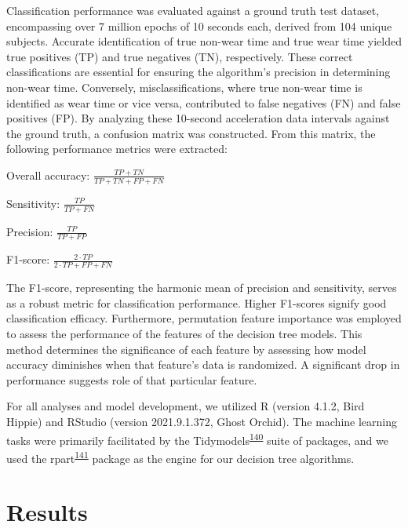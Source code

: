 \documentclass[
  10pt,
]{scrbook}
\begin{document}
Classification performance was evaluated against a ground truth test
dataset, encompassing over 7 million epochs of 10 seconds each, derived
from 104 unique subjects. Accurate identification of true non-wear time
and true wear time yielded true positives (TP) and true negatives (TN),
respectively. These correct classifications are essential for ensuring
the algorithm's precision in determining non-wear time. Conversely,
misclassifications, where true non-wear time is identified as wear time
or vice versa, contributed to false negatives (FN) and false positives
(FP). By analyzing these 10-second acceleration data intervals against
the ground truth, a confusion matrix was constructed. From this matrix,
the following performance metrics were extracted:

Overall accuracy: \(\frac{TP+TN}{TP+TN+FP+FN}\)

Sensitivity: \(\frac{TP}{TP+FN}​\)

Precision: \(\frac{TP}{TP+FP}\)

\hspace{0pt}F1-score: \(\frac{2 \cdot TP}{2 \cdot TP+FP+FN}​\)

The F1-score, representing the harmonic mean of precision and
sensitivity, serves as a robust metric for classification performance.
Higher F1-scores signify good classification efficacy. Furthermore,
permutation feature importance was employed to assess the performance of
the features of the decision tree models. This method determines the
significance of each feature by assessing how model accuracy diminishes
when that feature's data is randomized. A significant drop in
performance suggests role of that particular feature.

For all analyses and model development, we utilized R (version 4.1.2,
Bird Hippie) and RStudio (version 2021.9.1.372, Ghost Orchid). The
machine learning tasks were primarily facilitated by the
Tidymodels\textsuperscript{\protect\hyperlink{ref-kuhn_tidymodels_2020}{140}}
suite of packages, and we used the
rpart\textsuperscript{\protect\hyperlink{ref-rpart}{141}} package as the
engine for our decision tree algorithms.

\hypertarget{results-1}{%
\section{Results}\label{results-1}}
\end{document}
